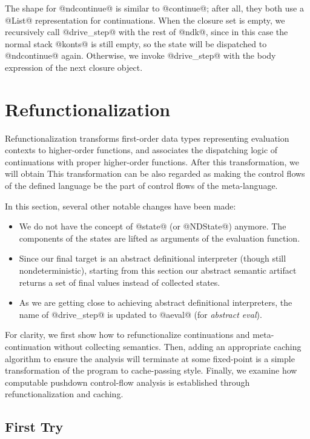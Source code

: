 \documentclass[acmsmall, review]{acmart}\settopmatter{}
\begin{document}
The shape for @ndcontinue@ is similar to @continue@; after
all, they both use a @List@ representation for continuations.
When the closure set is empty, we recursively call @drive_step@ with the rest
of @ndk@, since in this case the normal stack @konts@ is still empty, so
the state will be dispatched to @ndcontinue@ again.
Otherwise, we invoke @drive_step@ with the body expression of the next closure object.

\section{Refunctionalization} \label{sec:refunc}

Refunctionalization transforms first-order data types representing evaluation contexts 
to higher-order functions, and associates the dispatching logic of continuations with
proper higher-order functions.
After this transformation, we will obtain 
This transformation can be also regarded as making the control flows of the defined 
language be the part of control flows of the meta-language.

In this section, several other notable changes have been made:
\begin{itemize}
\item We do not have the concept of @state@ (or @NDState@) anymore.
  The components of the states are lifted as arguments of the evaluation function.
\item Since our final target is an abstract definitional interpreter (though still
  nondeterministic), starting from this section our abstract semantic artifact
  returns a set of final values instead of collected states.
\item As we are getting close to achieving abstract definitional interpreters, 
  the name of @drive_step@ is updated to @aeval@ (for \emph{abstract eval}).
\end{itemize}

For clarity, we first show how to refunctionalize continuations and meta-continuation 
without collecting semantics.
Then, adding an appropriate caching algorithm to ensure the analysis will
terminate at some fixed-point is a simple transformation of the program to cache-passing
style. Finally, we examine how computable pushdown control-flow analysis is established
through refunctionalization and caching.

\subsection{First Try}
\end{document}
